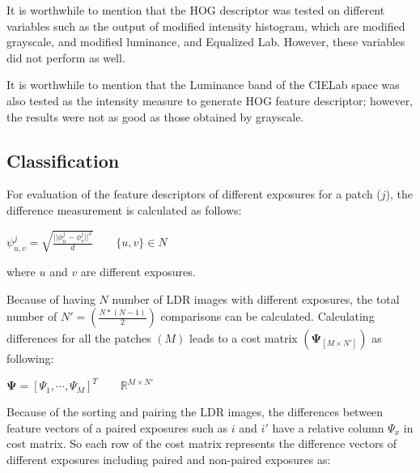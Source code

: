 \documentclass[preprint,12pt,3p]{elsarticle}
\begin{document}
It is worthwhile to mention that the HOG descriptor was tested on different variables such as the output of modified intensity histogram, which are modified grayscale, and modified luminance, and Equalized Lab. However, these variables did not perform as well.  

 It is worthwhile to mention that the Luminance band of the CIELab space was also tested as the intensity measure to generate HOG feature descriptor; however, the results were not as good as those obtained by grayscale.
 
\subsection{Classification}
For evaluation of the feature descriptors of different exposures for a patch ($j$), the difference measurement is calculated as follows:
\begin{center}
$ \psi_{u,v}^{j}=\sqrt{\frac{||\phi_{u}^{j} - \phi_{v}^{j}||^{2}}{d}} \qquad \{u,v\}\in N $
\end{center}

\noindent where $u$ and $v$ are different exposures. 

Because of having $N$ number of LDR images with different exposures, the total number of $ N'= (\frac{N*(N-1)}{2})$ comparisons can be calculated. Calculating differences for all the patches $(M)$ leads to a cost matrix $(\mathbf{\Psi}_{[M \times N']})$ as following:


\begin{center}
	$\mathbf{\Psi} = [\Psi_1, \cdots, \Psi_M]^T \qquad \mathbb{R}^{M \times N'}$
\end{center}

Because of the sorting and pairing the LDR images, the differences between feature vectors of a paired exposures such as $i$ and $i'$ have a relative column $\Psi_{x} $ in cost matrix. So each row of the cost matrix represents the difference vectors of different exposures including paired and non-paired exposures as: 
\end{document}
